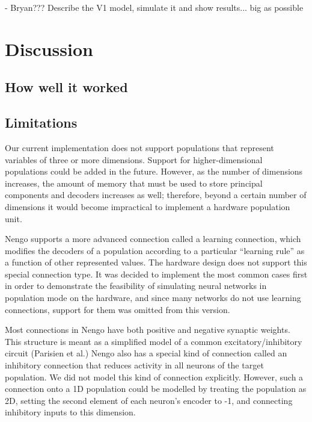 \documentclass[english]{article}
\begin{document}
- Bryan??? Describe the V1 model, simulate it and show results... big as possible


\section{Discussion}

\subsection{How well it worked}

\subsection{Limitations}

Our current implementation does not support populations that represent variables of three or more dimensions.
Support for higher-dimensional populations could be added in the future.
However, as the number of dimensions increases, the
amount of memory that must be used to store principal components and
decoders increases as well; therefore, beyond a certain number of
dimensions it would become impractical to implement a hardware
population unit.  

Nengo supports a more advanced connection called a learning connection,
which modifies the decoders of a population according to a particular ``learning rule''
as a function of other represented values. The hardware design does not support this special connection type.
It was decided to implement the most common cases first in order to demonstrate the feasibility of simulating
neural networks in population mode on the hardware, and since many networks do not use learning connections,
support for them was omitted from this version.

Most connections in Nengo have both positive and negative synaptic weights. This
structure is meant as a simplified model of a common excitatory/inhibitory circuit
(Parisien et al.) %
Nengo also has a special kind of connection called an inhibitory connection that
reduces activity in all neurons of the target population. We did not model this kind of connection explicitly.
However, such a connection onto a 1D population could be modelled by treating the population as 2D,
setting the second element of each neuron's encoder to -1, and connecting inhibitory inputs to this dimension.

\end{document}
